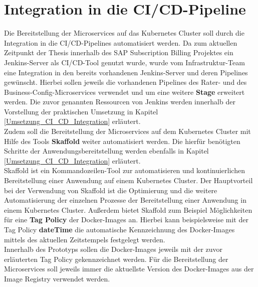 \section{Integration in die \acs{CI}/\acs{CD}-Pipeline}
\label{Konzeption_integration_ci_cd_pipeline}
Die Bereitstellung der Microservices auf das Kubernetes Cluster soll durch die Integration in die \ac{CI}/\ac{CD}-Pipelines automatisiert werden. Da zum aktuellen Zeitpunkt der Thesis innerhalb des SAP Subscription Billing Projektes ein Jenkins-Server als \ac{CI}/\ac{CD}-Tool genutzt wurde, wurde vom Infrastruktur-Team eine Integration in den bereits vorhandenen Jenkins-Server und deren Pipelines gewünscht. Hierbei sollen jeweils die vorhandenen Pipelines des Rater- und des Business-Config-Microservices verwendet und um eine weitere \textbf{Stage} erweitert werden. Die zuvor genannten Ressourcen von Jenkins werden innerhalb der Vorstellung der praktischen Umsetzung in Kapitel \ref{Umsetzung_CI_CD_Integration} erläutert.
\\
Zudem soll die Bereitstellung der Microservices auf dem Kubernetes Cluster mit Hilfe des Tools \textbf{Skaffold} weiter automatisiert werden. Die hierfür benötigten Schritte der Anwendungsbereitstellung werden ebenfalls in Kapitel \ref{Umsetzung_CI_CD_Integration} erläutert.\\
Skaffold ist ein Kommandozeilen-Tool zur automatisieren und kontinuierlichen Bereitstellung einer Anwendung auf einem Kubernetes Cluster. 
Der Hauptvorteil bei der Verwendung von Skaffold ist die Optimierung und die weitere Automatisierung der einzelnen Prozesse der Bereitstellung einer Anwendung in einem Kubernetes Cluster.\autocite[Vgl.][]{SkaffoldAuthors.20200131}
\newpage
Außerdem bietet Skaffold zum Beispiel Möglichkeiten für eine \textbf{Tag Policy} der Docker-Images an. Hierbei kann beispielsweise mit der Tag Policy \textbf{dateTime} die automatische Kennzeichnung des Docker-Images mittels des aktuellen Zeitstempels festgelegt werden.\autocite[Vgl.][]{SkaffoldAuthors.20200131b} \\
Innerhalb des Prototyps sollen die Docker-Images jeweils mit der zuvor erläuterten Tag Policy gekennzeichnet werden. Für die Bereitstellung der Microservices soll jeweils immer die aktuellste Version des Docker-Images aus der Image Registry verwendet werden.

